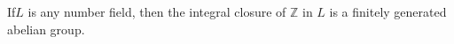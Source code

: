 If$L$ is any number field, then the integral closure of $\mathbb{Z}$ in $L$ is
a finitely generated abelian group.
